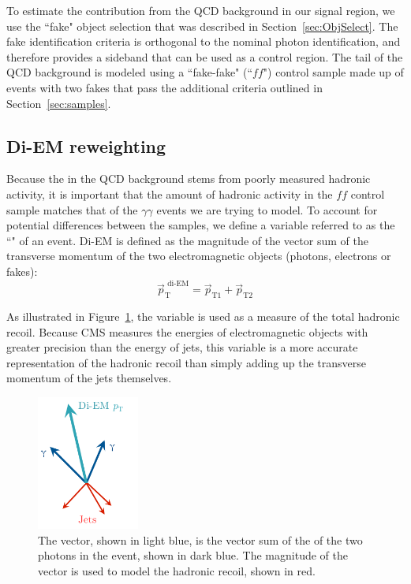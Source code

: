 To estimate the contribution from the QCD background in our signal region, we use the ``fake" object selection that was described in Section~\ref{sec:ObjSelect}. The fake identification criteria is orthogonal to the nominal photon identification, and therefore provides a sideband that can be used as a control region. The \ETmiss tail of the QCD background is modeled using a ``fake-fake" (``$ff$") control sample made up of events with two fakes that pass the additional criteria outlined in Section~\ref{sec:samples}.

\subsection{Di-EM \pT reweighting}
\label{sec:diempt}

Because the \ETmiss in the QCD background stems from poorly measured hadronic activity, it is important that the amount of hadronic activity in the $ff$ control sample matches that of the $\gamma\gamma$ events we are trying to model.
To account for potential differences between the samples, we define a variable referred to as the ``\diempt" of an event. Di-EM \pT is defined as the magnitude of
the vector sum of the transverse momentum of the two electromagnetic objects (photons, electrons or fakes):
\begin{equation}
 \vec{p}_\mathrm{T}^{\, \,\mathrm{di\mbox{-}EM}}=\vec{p}_{\mathrm{T}1}+\vec{p}_{\mathrm{T}2}
 \label{equ:diempt}
\end{equation}

As illustrated in Figure~\ref{fig:diempt}, the \diempt variable is used as a measure of the total hadronic recoil. Because CMS measures the energies of electromagnetic objects with greater precision than the energy of jets, this variable is a more accurate representation of the hadronic recoil than simply adding up the transverse momentum of the jets themselves. 

\begin{figure}[h]
\begin{center}
\includegraphics[width=0.3\textwidth]{Figures/DataAnalysis/Diempt.pdf}
\end{center}
\caption{The \diempt vector, shown in light blue, is the vector sum of the \pT of the two photons in the event, shown in dark blue. The magnitude of the \diempt vector is used to model the hadronic recoil, shown in red. }
\label{fig:diempt}
\end{figure}

